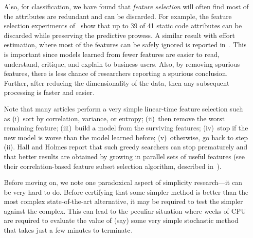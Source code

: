 \documentclass[preprint,10pt]{elsarticle}
\begin{document}
Also, for classification, we have found that {\em feature selection} will often find most of the attributes are redundant and can be discarded.  For example, the feature selection experiments of~\cite{menzies07} show that up to 39 of 41 static code attributes can be discarded while preserving the predictive prowess. A similar result with effort estimation, where most of the features can be safely ignored is reported in~\cite{chen2005}. This is important since models learned from fewer features are easier to read, understand, critique, and explain to business users. Also, by removing spurious features, there is less chance of researchers reporting a spurious conclusion. Further, after reducing the dimensionality of the data, then any subsequent processing is faster and easier.

Note that many articles perform a very simple linear-time feature selection such as (i)~sort by correlation, variance, or entropy; (ii)~then remove the worst remaining feature; (iii)~build a model from the surviving features; (iv)~stop if the new model is worse than the model learned before; (v)~otherwise, go back to step (ii).  Hall and Holmes report that such greedy searchers can stop prematurely and that better results are obtained by growing in parallel sets of useful features (see their 
correlation-based feature subset selection
algorithm, described in~\cite{hall2003benchmarking}).

Before moving on, we note one paradoxical aspect of simplicity research---it can be very hard to do. Before certifying that some simpler method is better than the most complex state-of-the-art alternative, it may be required to test the simpler against the complex. This can lead to the peculiar situation where weeks of CPU are required to evaluate the value of (say) some very simple stochastic method that takes just a few minutes to terminate.
\end{document}
